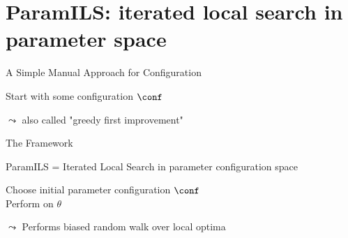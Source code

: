 \section{ParamILS: iterated local search in parameter space}


\begin{frame}[c,fragile]{A Simple Manual Approach for Configuration}

\NoCaptionOfAlgo
\LinesNotNumbered
\begin{algorithm}[H]
Start with some configuration $\conf$\;
\caption{\textbf{Algorithm 1: Manual Greedy Algorithm Configuration}}
\end{algorithm}

\pause
\smallskip

$\leadsto$ also called "greedy first improvement"

\end{frame}




\begin{frame}[c,fragile]{The \paramils{} Framework}

\vspace*{-0.3cm}ParamILS = Iterated Local Search in parameter configuration space
\bigskip

\NoCaptionOfAlgo
\LinesNotNumbered
\begin{algorithm}[H]
Choose initial parameter configuration $\conf$\\
Perform  on $\theta$\\
\caption{\textbf{Algorithm 2: ParamILS}}
\end{algorithm}

\bigskip
$\leadsto$ Performs \alert{biased random walk over local optima}

\end{frame}



